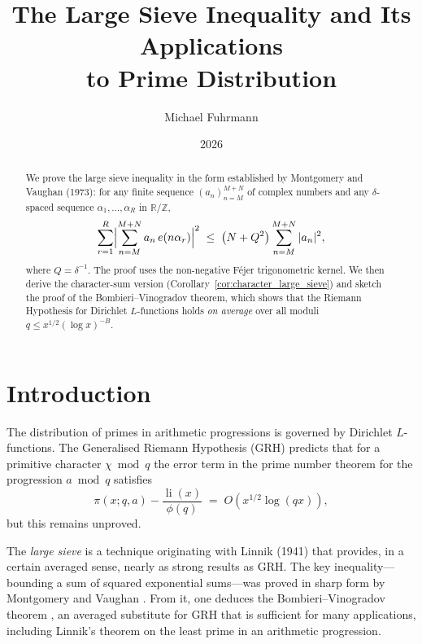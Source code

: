 \documentclass[12pt,a4paper]{amsart}
\theoremstyle{definition}
\newcommand{\Z}{\mathbb{Z}}
\newcommand{\R}{\mathbb{R}}
\DeclareMathOperator{\li}{li}
\newcommand{\eexp}[1]{e\!\left(#1\right)}
\begin{document}

\title{The Large Sieve Inequality and Its Applications\\to Prime Distribution}

\author{Michael Fuhrmann}
\address{Specialist Mathematics Project, Build 56}
\date{2026}

\begin{abstract}
We prove the large sieve inequality in the form established by Montgomery
and Vaughan (1973): for any finite sequence $(a_n)_{n=M}^{M+N}$ of complex
numbers and any $\delta$-spaced sequence $\alpha_1,\ldots,\alpha_R$ in
$\R/\Z$,
\[
  \sum_{r=1}^{R}\Bigl|\sum_{n=M}^{M+N} a_n\,\eexp{n\alpha_r}\Bigr|^{2}
  \;\leq\;
  \bigl(N + Q^{2}\bigr)\sum_{n=M}^{M+N}|a_n|^{2},
\]
where $Q = \delta^{-1}$.  The proof uses the non-negative Féjer trigonometric
kernel.  We then derive the character-sum version
(Corollary~\ref{cor:character_large_sieve}) and sketch the proof of the
Bombieri--Vinogradov theorem, which shows that the Riemann Hypothesis for
Dirichlet $L$-functions holds \emph{on average} over all moduli $q \leq
x^{1/2}(\log x)^{-B}$.
\end{abstract}

\maketitle
\tableofcontents

\section{Introduction}

The distribution of primes in arithmetic progressions is governed by
Dirichlet $L$-functions.  The Generalised Riemann Hypothesis (GRH) predicts
that for a primitive character $\chi\bmod q$ the error term in the prime
number theorem for the progression $a\bmod q$ satisfies
\[
  \pi(x;q,a) - \frac{\li(x)}{\phi(q)}
  \;=\; O\!\left(x^{1/2}\log(qx)\right),
\]
but this remains unproved.

The \emph{large sieve} is a technique originating with Linnik (1941) that
provides, in a certain averaged sense, nearly as strong results as GRH.
The key inequality---bounding a sum of squared exponential sums---was proved
in sharp form by Montgomery and Vaughan \cite{MV1973}.  From it, one deduces
the Bombieri--Vinogradov theorem \cite{Bombieri1965}, an averaged substitute
for GRH that is sufficient for many applications, including Linnik's theorem
on the least prime in an arithmetic progression.
\end{document}

